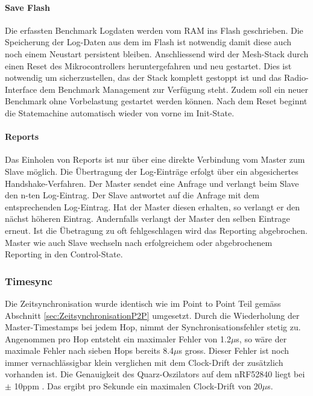 \paragraph{Save Flash}
Die erfassten Benchmark Logdaten werden vom RAM ins Flash geschrieben.
Die Speicherung der Log-Daten aus dem im Flash ist notwendig damit diese auch noch einem Neustart persistent bleiben.
Anschliessend wird der Mesh-Stack durch einen Reset des Mikrocontrollers heruntergefahren und neu gestartet.
Dies ist notwendig um sicherzustellen, das der Stack komplett gestoppt ist und das Radio-Interface dem Benchmark Management zur Verfügung steht.
Zudem soll ein neuer Benchmark ohne Vorbelastung gestartet werden können.
Nach dem Reset beginnt die Statemachine automatisch wieder von vorne im Init-State. 

\paragraph{Reports}
Das Einholen von Reports ist nur über eine direkte Verbindung vom Master zum Slave möglich.
Die Übertragung der Log-Einträge erfolgt über ein abgesichertes Handshake-Verfahren.
Der Master sendet eine Anfrage und verlangt beim Slave den n-ten Log-Eintrag.
Der Slave antwortet auf die Anfrage mit dem entsprechenden Log-Eintrag.
Hat der Master diesen erhalten, so verlangt er den nächst höheren Eintrag.
Andernfalls verlangt der Master den selben Eintrage erneut.
Ist die Übetragung zu oft fehlgeschlagen wird das Reporting abgebrochen.
Master wie auch Slave wechseln nach erfolgreichem oder abgebrochenem Reporting in den Control-State.  

\subsubsection{Timesync}\label{subsubsec:Timesync}
Die Zeitsynchronisation wurde identisch wie im Point to Point Teil gemäss Abschnitt \ref{sec:ZeitsynchronisationP2P} umgesetzt.
Durch die Wiederholung der Master-Timestamps bei jedem Hop, nimmt der Synchronisationsfehler stetig zu.
Angenommen pro Hop entsteht ein maximaler Fehler von 1.2$\mu$s, so wäre der maximale Fehler nach sieben Hops bereits 8.4$\mu$s gross.
Dieser Fehler ist noch immer vernachlässigbar klein verglichen mit dem Clock-Drift der zusätzlich vorhanden ist.
Die Genauigkeit des Quarz-Oszilators auf dem nRF52840 liegt bei $\pm$ 10ppm \cite{nordic_semiconductor_asa_nrf52840_ps_v11pdf_nodate}.
Das ergibt pro Sekunde ein maximalen Clock-Drift von 20$\mu$s. 

